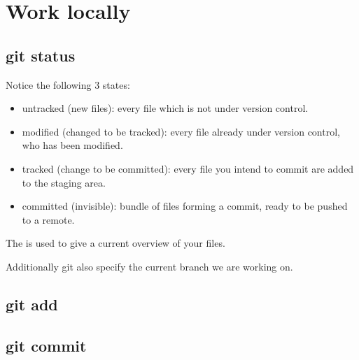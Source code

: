 \section{Work locally}
\begin{frame}[fragile]
    \slidetitle
\end{frame}

\subsection{git status}
\begin{frame}[fragile]
    \subslidetitle
Notice the following 3 states:
\begin{itemize}
\item untracked (new files): every file which is not under version control.
\item modified (changed to be tracked): every file already under version control, who has been modified.
\item tracked (change to be committed): every file you intend to commit are added to the staging area.
\item committed (invisible): bundle of files forming a commit, ready to be pushed to a remote.
\end{itemize}

The  is used to give a current overview of your files.

Additionally git also specify the current branch we are working on.
\end{frame}

\subsection{git add}
\begin{frame}[fragile]
    \subslidetitle
\end{frame}

\subsection{git commit}
\begin{frame}[fragile]
    \subslidetitle
\end{frame}

